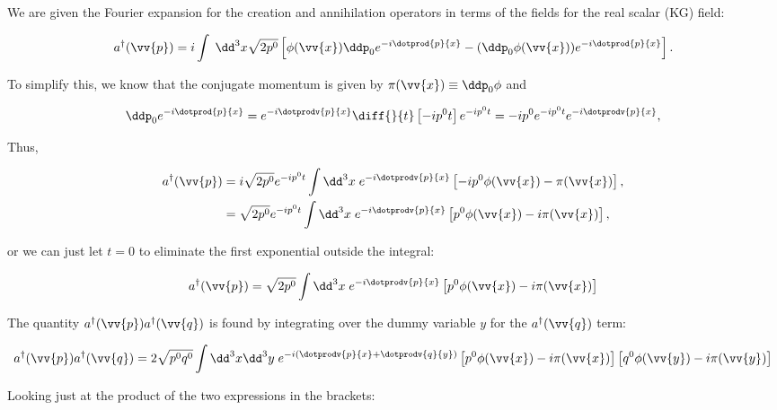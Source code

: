 \section{}

We are given the Fourier expansion for the creation and annihilation operators in terms of the fields for the real scalar (KG) field:

\begin{equation}
    a^{\dagger}(\vv{p}) = i\int \;\dd^3x \sqrt{2p^0} \left[ \phi(\vv{x}) \ddp_0 e^{-i\dotprod{p}{x}} - (\ddp_0\phi(\vv{x}))e^{-i\dotprod{p}{x}} \right].
\end{equation}

To simplify this, we know that the conjugate momentum is given by $\pi(\vv{x}) \equiv \ddp_0\phi$ and 

\begin{equation*}
    \ddp_0e^{-i\dotprod{p}{x}} = e^{-i\dotprodv{p}{x}}\diff{}{t}\left[ -ip^0t \right] e^{-ip^0t} = -ip^0e^{-ip^0t}e^{-i\dotprodv{p}{x}},
\end{equation*}

Thus,

\begin{align*}
    a^{\dagger}(\vv{p}) &= i\sqrt{2p^0}e^{-ip^0t} \int \dd^3x\; e^{-i\dotprodv{p}{x}} \left[ -ip^0\phi(\vv{x}) - \pi(\vv{x}) \right], \\
    &= \sqrt{2p^0}e^{-ip^0t} \int \dd^3x\; e^{-i\dotprodv{p}{x}} \left[ p^0\phi(\vv{x}) - i\pi(\vv{x}) \right],
\end{align*}

or we can just let $t=0$ to eliminate the first exponential outside the integral:

\begin{equation*}
    a^{\dagger}(\vv{p}) = \sqrt{2p^0}\int \dd^3x\; e^{-i\dotprodv{p}{x}} \left[ p^0\phi(\vv{x}) - i\pi(\vv{x}) \right]
\end{equation*}

The quantity $a^{\dagger}(\vv{p})a^{\dagger}(\vv{q})$ is found by integrating over the dummy variable $y$ for the $a^{\dagger}(\vv{q})$ term:

\begin{equation*}
    a^{\dagger}(\vv{p})a^{\dagger}(\vv{q}) = 2\sqrt{p^0q^0}\int \dd^3x\dd^3y \; e^{-i(\dotprodv{p}{x} + \dotprodv{q}{y})} \left[ p^0\phi(\vv{x}) - i\pi(\vv{x}) \right]\left[ q^0\phi(\vv{y}) - i\pi(\vv{y}) \right]
\end{equation*}

Looking just at the product of the two expressions in the brackets:

